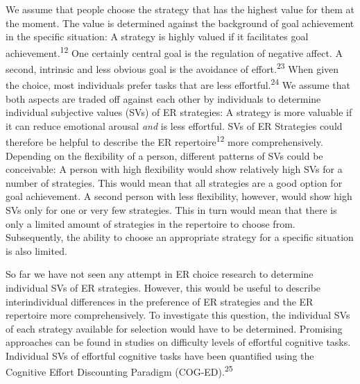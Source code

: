\documentclass[
  english,
  man,floatsintext]{apa6}
\begin{document}
We assume that people choose the strategy that has the highest value for them at the moment.
The value is determined against the background of goal achievement in the specific situation: A strategy is highly valued if it facilitates goal achievement.\textsuperscript{12}
One certainly central goal is the regulation of negative affect.
A second, intrinsic and less obvious goal is the avoidance of effort.\textsuperscript{23}
When given the choice, most individuals prefer tasks that are less effortful.\textsuperscript{24}
We assume that both aspects are traded off against each other by individuals to determine individual subjective values (SVs) of ER strategies: A strategy is more valuable if it can reduce emotional arousal \emph{and} is less effortful.
SVs of ER Strategies could therefore be helpful to describe the ER repertoire\textsuperscript{12} more comprehensively.
Depending on the flexibility of a person, different patterns of SVs could be conceivable: A person with high flexibility would show relatively high SVs for a number of strategies.
This would mean that all strategies are a good option for goal achievement.
A second person with less flexibility, however, would show high SVs only for one or very few strategies.
This in turn would mean that there is only a limited amount of strategies in the repertoire to choose from.
Subsequently, the ability to choose an appropriate strategy for a specific situation is also limited.

So far we have not seen any attempt in ER choice research to determine individual SVs of ER strategies.
However, this would be useful to describe interindividual differences in the preference of ER strategies and the ER repertoire more comprehensively.
To investigate this question, the individual SVs of each strategy available for selection would have to be determined.
Promising approaches can be found in studies on difficulty levels of effortful cognitive tasks.\\
Individual SVs of effortful cognitive tasks have been quantified using the Cognitive Effort Discounting Paradigm (COG-ED).\textsuperscript{25}
\end{document}
